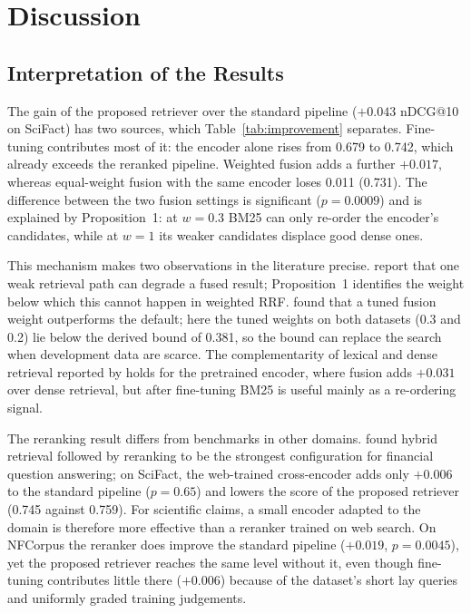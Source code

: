 \section{Discussion}
\label{sec:discussion}

\subsection{Interpretation of the Results}
\label{sec:disc-results}

The gain of the proposed retriever over the standard pipeline ($+0.043$ nDCG@10 on SciFact) has
two sources, which Table~\ref{tab:improvement} separates. Fine-tuning contributes most of it: the
encoder alone rises from 0.679 to 0.742, which already exceeds the reranked pipeline. Weighted
fusion adds a further $+0.017$, whereas equal-weight fusion with the same encoder loses 0.011
(0.731). The difference between the two fusion settings is significant ($p = 0.0009$) and is
explained by Proposition~1: at $w = 0.3$ BM25 can only re-order the encoder's candidates, while
at $w = 1$ its weaker candidates displace good dense ones.

This mechanism makes two observations in the literature precise. \textcite{wang2026blend} report
that one weak retrieval path can degrade a fused result; Proposition~1 identifies the weight
below which this cannot happen in weighted RRF. \textcite{bruch2024fusion} found that a tuned
fusion weight outperforms the default; here the tuned weights on both datasets (0.3 and 0.2) lie
below the derived bound of 0.381, so the bound can replace the search when development data are
scarce. The complementarity of lexical and dense retrieval reported by \textcite{chen2022hybrid}
holds for the pretrained encoder, where fusion adds $+0.031$ over dense retrieval, but after
fine-tuning BM25 is useful mainly as a re-ordering signal.

The reranking result differs from benchmarks in other domains. \textcite{akarsu2026bm25} found
hybrid retrieval followed by reranking to be the strongest configuration for financial question
answering; on SciFact, the web-trained cross-encoder adds only $+0.006$ to the standard pipeline
($p = 0.65$) and lowers the score of the proposed retriever (0.745 against 0.759). For scientific
claims, a small encoder adapted to the domain is therefore more effective than a reranker trained
on web search. On NFCorpus the reranker does improve the standard pipeline ($+0.019$,
$p = 0.0045$), yet the proposed retriever reaches the same level without it, even though
fine-tuning contributes little there ($+0.006$) because of the dataset's short lay queries and
uniformly graded training judgements.

